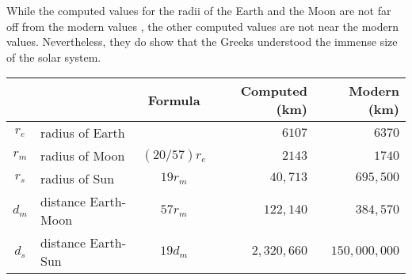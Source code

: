 While the computed values for the radii of the Earth and the Moon are not far off from the modern values \cite[Table~1.3]{hahn-cic}, the other computed values are not near the modern values. Nevertheless, they do show that the Greeks understood the immense size of the solar system.\label{p.table1}
\begin{center}
\begin{tabular}{|cl|c|r|r|}
\hline
\multicolumn{2}{|c|}{}&Formula&Computed (km)&Modern (km)\\
\hline\hline
$r_e$&radius of Earth&& $6107$   & $6370$\\
$r_m$&radius of Moon& $(20/57)r_e$& $2143$   & $1740$\\
$r_s$&radius of Sun& $19r_m$ &$40,713$ & $695,500$\\
$d_m$&distance Earth-Moon&$57r_m$& $122,140$   & $384,570$\\
$d_s$&distance Earth-Sun&$19 d_m$ &$2,320,660$ & $150,000,000$\\
\hline
\end{tabular}
\end{center}

